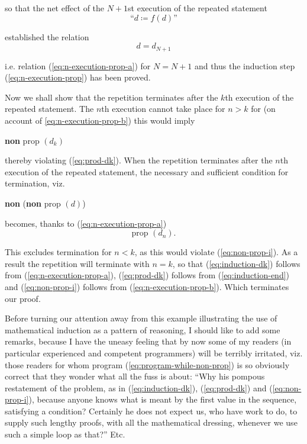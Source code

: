 \noindent
so that the net effect of the $N + 1$st execution of the repeated statement
$$
\text{``}d \coloneq f(d)\text{''}
$$

\noindent
established the relation
$$
d = d_{N + 1}
$$

\noindent
i.e. relation (\ref{eq:n-execution-prop-a}) for $N = N + 1$ and thus the induction step (\ref{eq:n-execution-prop}) has been
proved.

Now we shall show that the repetition terminates after the $k$th execution of the repeated statement. The $n$th execution cannot take place for $n > k$
for (on account of \ref{eq:n-execution-prop-b}) this would imply
\begin{center}
	\textbf{non} prop $(d_k)$
\end{center}

\noindent 
thereby violating (\ref{eq:prod-dk}). When the repetition terminates after the $n$th execution of the repeated statement, the necessary and sufficient condition for termination, viz.
\begin{center}
	\textbf{non} (\textbf{non} prop $(d)$)
\end{center}

\noindent
becomes, thanks to (\ref{eq:n-execution-prop-a})
\begin{equation}
	\label{eq:induction-end}
	\text{prop } (d_n).
\end{equation}

This excludes termination for $n < k$, as this would violate (\ref{eq:non-prop-i}). As a result the repetition will terminate with $n = k$, so that (\ref{eq:induction-dk}) follows from (\ref{eq:n-execution-prop-a}), (\ref{eq:prod-dk}) follows from (\ref{eq:induction-end}) and (\ref{eq:non-prop-i}) follows from (\ref{eq:n-execution-prop-b}). Which terminates our proof.

Before turning our attention away from this example illustrating the use of mathematical induction as a pattern of reasoning, I should like to add some remarks, because I have the uneasy feeling that by now some of my readers (in particular experienced and competent programmers) will be terribly irritated, viz. those readers for whom program (\ref{eq:program-while-non-prop}) is so obviously correct that they wonder what all the fuss is about: ``Why his pompous restatement of the problem, as in (\ref{eq:induction-dk}), (\ref{eq:prod-dk}) and (\ref{eq:non-prop-i}), because anyone knows what is meant by the first value in the sequence, satisfying a condition? Certainly he does not expect us, who have work to do, to supply such lengthy proofs, with all the mathematical dressing, whenever we use such a simple loop as that?'' Etc.

